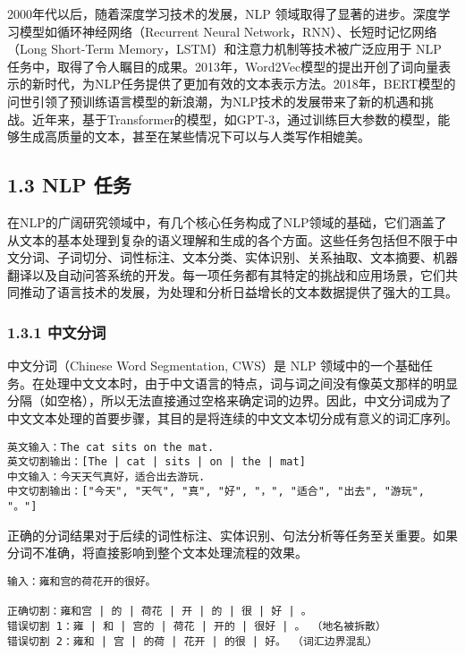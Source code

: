 \documentclass[12pt,a4paper]{book}
\begin{document}
2000年代以后，随着深度学习技术的发展，NLP
领域取得了显著的进步。深度学习模型如循环神经网络（Recurrent Neural
Network，RNN）、长短时记忆网络（Long Short-Term
Memory，LSTM）和注意力机制等技术被广泛应用于 NLP
任务中，取得了令人瞩目的成果。2013年，Word2Vec模型的提出开创了词向量表示的新时代，为NLP任务提供了更加有效的文本表示方法。2018年，BERT模型的问世引领了预训练语言模型的新浪潮，为NLP技术的发展带来了新的机遇和挑战。近年来，基于Transformer的模型，如GPT-3，通过训练巨大参数的模型，能够生成高质量的文本，甚至在某些情况下可以与人类写作相媲美。

\subsection{1.3 NLP 任务}\label{nlp-ux4efbux52a1}

在NLP的广阔研究领域中，有几个核心任务构成了NLP领域的基础，它们涵盖了从文本的基本处理到复杂的语义理解和生成的各个方面。这些任务包括但不限于中文分词、子词切分、词性标注、文本分类、实体识别、关系抽取、文本摘要、机器翻译以及自动问答系统的开发。每一项任务都有其特定的挑战和应用场景，它们共同推动了语言技术的发展，为处理和分析日益增长的文本数据提供了强大的工具。

\subsubsection{1.3.1 中文分词}\label{ux4e2dux6587ux5206ux8bcd}

中文分词（Chinese Word Segmentation, CWS）是 NLP
领域中的一个基础任务。在处理中文文本时，由于中文语言的特点，词与词之间没有像英文那样的明显分隔（如空格），所以无法直接通过空格来确定词的边界。因此，中文分词成为了中文文本处理的首要步骤，其目的是将连续的中文文本切分成有意义的词汇序列。

\begin{verbatim}
英文输入：The cat sits on the mat.
英文切割输出：[The | cat | sits | on | the | mat]
中文输入：今天天气真好，适合出去游玩.
中文切割输出：["今天", "天气", "真", "好", "，", "适合", "出去", "游玩", "。"]
\end{verbatim}

正确的分词结果对于后续的词性标注、实体识别、句法分析等任务至关重要。如果分词不准确，将直接影响到整个文本处理流程的效果。

\begin{verbatim}
输入：雍和宫的荷花开的很好。

正确切割：雍和宫 | 的 | 荷花 | 开 | 的 | 很 | 好 | 。
错误切割 1：雍 | 和 | 宫的 | 荷花 | 开的 | 很好 | 。 （地名被拆散）
错误切割 2：雍和 | 宫 | 的荷 | 花开 | 的很 | 好。 （词汇边界混乱）
\end{verbatim}
\end{document}
